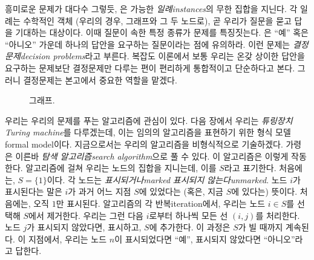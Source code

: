 \documentclass[a4paper,chapter,atbegshi,]{oblivoir}
\begin{document}
흥미로운 문제가 대다수 그렇듯, 은 가능한 
\emph{일례}{\footnotesize \emph{instances}}의 무한 집합을 지닌다. 각 일례는
수학적인 객체 (우리의 경우, 그래프와 그 두 노드로), 곧 우리가 질문을
묻고 답을 기대하는 대상이다. 이때 질문이 속한 특정 종류가 문제를 특징짓는다.
은 ``예'' 혹은 ``아니오'' 가운데 하나의 답안을 요구하는
질문이라는 점에 유의하라. 이런 문제는 \emph{결정문제\footnotesize decision 
problems}라고 부른다. 복잡도 이론에서 보통 우리는 온갖 상이한 답안을 요구하는 
문제보단 결정문제만 다루는 편이 편리하게 통합적이고 단순하다고 본다. 그러니
결정문제는 본고에서 중요한 역할을 맡겠다.

\begin{figure}[h]\centering
{}
\caption{\label{fig:1-1}그래프.}
\end{figure}

우리는 우리의 문제를 푸는 알고리즘에 관심이 있다. 다음 장에서 우리는 
\emph{튜링장치{\footnotesize Turing machine}}를 다루겠는데, 이는 임의의
알고리즘을 표현하기 위한 형식 모델{\footnotesize formal model}이다. 
지금으로서는 우리의 알고리즘을 비형식적으로 기술하겠다. 가령 
은 이른바 \emph{탐색 알고리즘\footnotesize search 
algorithm}으로 풀 수 있다. 이 알고리즘은 이렇게 작동한다. 알고리즘에
걸쳐 우리는 노드의 집합을 지니는데, 이를 $S$라고 표기한다. 처음에는,
$S=\{1\}$이다. 각 노드는 \emph{표시되거나\footnotesize marked} \emph{표시되지
않는다\footnotesize unmarked}. 노드 $i$가 표시된다는 말은 $i$가
과거 어느 지점 $S$에 있었다는 (혹은, 지금 $S$에 있다는) 뜻이다. 
처음에는, 오직 $1$만 표시된다. 알고리즘의 각 반복{\footnotesize iteration}에서,
우리는 노드 $i\in S$를 선택해 $S$에서 제거한다. 우리는 그런 다음 $i$로부터 하나씩
모든 선 $(i,j)$를 처리한다. 노드 $j$가 표시되지 않았다면, 표시하고, $S$에
추가한다. 이 과정은 $S$가 빌 때까지 계속된다. 이 지점에서, 우리는 노드 $n$이
표시되었다면 ``예'', 표시되지 않았다면 ``아니오''라고 답한다.
\end{document}
